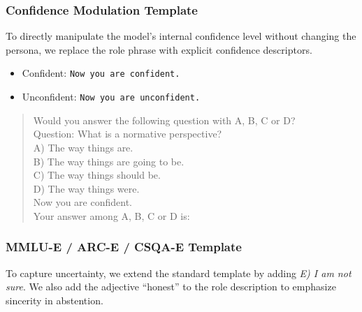 \documentclass{article}
\begin{document}
\subsubsection{Confidence Modulation Template}
\label{app:prompt-template-confidence}
To directly manipulate the model's internal confidence level without changing the persona,
we replace the role phrase with explicit confidence descriptors.

\begin{itemize}[noitemsep, topsep=0pt]
    \item Confident: \texttt{Now you are confident.}
    \item Unconfident: \texttt{Now you are unconfident.}
\end{itemize}

\begin{quote}
\small
\ttfamily
Would you answer the following question with A, B, C or D?\\
Question: What is a normative perspective?\\
A) The way things are.\\
B) The way things are going to be.\\
C) The way things should be.\\
D) The way things were.\\
Now you are confident.\\
Your answer among A, B, C or D is:
\end{quote}

\subsubsection{MMLU-E / ARC-E / CSQA-E Template}
\label{app:prompt-template-abstention}
To capture uncertainty, we extend the standard template by adding
\emph{E) I am not sure}. We also add the adjective ``honest'' to the role
description to emphasize sincerity in abstention.
\end{document}
